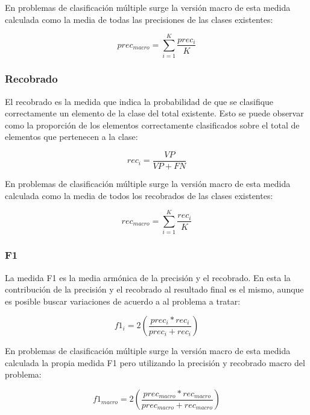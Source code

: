 En problemas de clasificación múltiple surge la versión macro de esta medida calculada como la media de todas
las precisiones de las clases existentes:

\begin{equation}
	prec_{macro} = \sum^K_{i=1} \frac{prec_i}{K}
\end{equation}

\subsubsection{Recobrado}

El recobrado es la medida que indica la probabilidad de que se clasifique correctamente un elemento de la clase
del total existente. Esto se puede observar como la proporción de los elementos correctamente clasificados sobre el 
total de elementos que pertenecen a la clase:

\begin{equation}
	rec_i = \frac{VP}{VP + FN}
\end{equation}

En problemas de clasificación múltiple surge la versión macro de esta medida calculada como la media de todos
los recobrados de las clases existentes:

\begin{equation}
	rec_{macro} = \sum^K_{i=1} \frac{rec_i}{K}
\end{equation}

\subsubsection{F1}

La medida F1 es la media armónica de la precisión y el recobrado. En esta la contribución de la precisión y el
recobrado al resultado final es el mismo, aunque es posible buscar variaciones de acuerdo a al problema a tratar:

\begin{equation}
	f1_i = 2 (\frac{prec_i * rec_i}{prec_i + rec_i})
\end{equation}

En problemas de clasificación múltiple surge la versión macro de esta medida calculada la propia medida F1 pero
utilizando la precisión y recobrado macro del problema:

\begin{equation}
	f1_{macro} = 2 (\frac{prec_{macro} * rec_{macro}}{prec_{macro} + rec_{macro}})
\end{equation}

